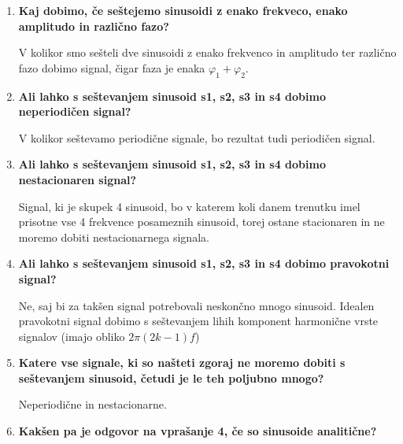 \documentclass[a4paper,11pt]{article}
\begin{document}
\begin{enumerate}
	\item\textbf{Kaj dobimo, če seštejemo sinusoidi z enako frekveco, enako amplitudo in različno fazo?}

		V kolikor smo sešteli dve sinusoidi z enako frekvenco in amplitudo ter različno fazo dobimo signal, čigar faza je enaka $\varphi_1 + \varphi_2$.


 	\item \textbf{Ali lahko s seštevanjem sinusoid s1, s2, s3 in s4 dobimo neperiodičen signal?}

V kolikor seštevamo periodične signale, bo rezultat tudi periodičen signal.

 	
	\item \textbf{Ali lahko s seštevanjem sinusoid s1, s2,  s3 in s4 dobimo nestacionaren signal?}
	
Signal, ki je skupek 4 sinusoid, bo v katerem koli danem trenutku imel prisotne vse 4 frekvence posameznih sinusoid, torej ostane stacionaren in ne moremo dobiti nestacionarnega signala.	
	
	\item \textbf{Ali lahko s seštevanjem sinusoid s1, s2, s3 in s4 dobimo pravokotni signal?}

Ne, saj bi za takšen signal potrebovali neskončno mnogo sinusoid. Idealen pravokotni signal dobimo s seštevanjem lihih komponent harmonične vrste signalov (imajo obliko $2\pi (2k − 1)f$)
	
	
	\item \textbf{Katere vse signale, ki so našteti zgoraj ne moremo dobiti s seštevanjem sinusoid, četudi je le teh poljubno mnogo?}
	
Neperiodične in nestacionarne.

	\item \textbf{Kakšen pa je odgovor na vprašanje 4, če so sinusoide analitične?}

\end{enumerate}
\end{document}
